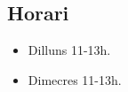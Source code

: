\documentclass[../main.tex]{subfiles}
\begin{document}
\subsection*{Horari}
\begin{itemize}
    \item Dilluns 11-13h.
    \item Dimecres 11-13h.
\end{itemize}
\end{document}
